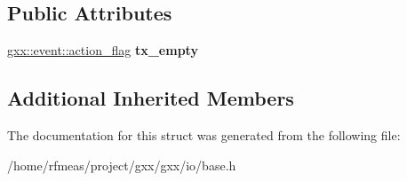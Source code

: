 \subsection*{Public Attributes}
\begin{DoxyCompactItemize}
\item 
\hyperlink{classgxx_1_1event_1_1action__flag}{gxx\+::event\+::action\+\_\+flag} {\bfseries tx\+\_\+empty}\hypertarget{structgxx_1_1io_1_1ostorage_a94330948f69f2379995eca834def5666}{}\label{structgxx_1_1io_1_1ostorage_a94330948f69f2379995eca834def5666}

\end{DoxyCompactItemize}
\subsection*{Additional Inherited Members}


The documentation for this struct was generated from the following file\+:\begin{DoxyCompactItemize}
\item 
/home/rfmeas/project/gxx/gxx/io/base.\+h\end{DoxyCompactItemize}
